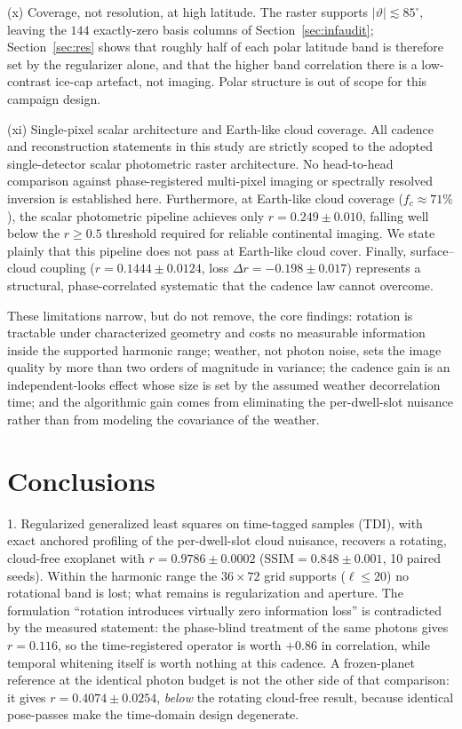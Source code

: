 \documentclass[twocolumn,10pt]{article}
\begin{document}
(x) Coverage, not resolution, at high latitude. The raster supports
$|\vartheta|\lesssim85^{\circ}$, leaving the $144$ exactly-zero basis columns of
Section~\ref{sec:infaudit}; Section~\ref{sec:res} shows that roughly half of each
polar latitude band is therefore set by the regularizer alone, and that the
higher band correlation there is a low-contrast ice-cap artefact, not imaging.
Polar structure is out of scope for this campaign design.

(xi) Single-pixel scalar architecture and Earth-like cloud coverage. All
cadence and reconstruction statements in this study are strictly scoped to the
adopted single-detector scalar photometric raster architecture. No head-to-head
comparison against phase-registered multi-pixel imaging or spectrally resolved
inversion is established here. Furthermore, at Earth-like cloud coverage
($f_c \approx 71\%$), the scalar photometric pipeline achieves only $r=0.249\pm0.010$,
falling well below the $r \ge 0.5$ threshold required for reliable continental
imaging. We state plainly that this pipeline does not pass at Earth-like cloud cover.
Finally, surface--cloud coupling ($r=0.1444\pm0.0124$, loss $\Delta r=-0.198\pm0.017$)
represents a structural, phase-correlated systematic that the cadence law cannot overcome.

These limitations narrow, but do not remove, the core findings: rotation is
tractable under characterized geometry and costs no measurable information
inside the supported harmonic range; weather, not photon noise, sets the image
quality by more than two orders of magnitude in variance; the cadence gain is an
independent-looks effect whose size is set by the assumed weather decorrelation
time; and the algorithmic gain comes from eliminating the per-dwell-slot nuisance
rather than from modeling the covariance of the weather.
\section{Conclusions}
\label{sec:conclusions}

1. Regularized generalized least squares on time-tagged samples (TDI), with
exact anchored profiling of the per-dwell-slot cloud nuisance, recovers a
rotating, cloud-free exoplanet with $r=0.9786\pm0.0002$
($\mathrm{SSIM}=0.848\pm0.001$, 10 paired seeds). Within the harmonic range the
$36\times72$ grid supports ($\ell\le20$) no rotational band is lost; what remains
is regularization and aperture. The formulation ``rotation introduces
virtually zero information loss'' is contradicted by the measured statement: the
phase-blind treatment of the same photons gives $r=0.116$, so the time-registered
operator is worth $+0.86$ in correlation, while temporal whitening itself is
worth nothing at this cadence. A frozen-planet reference at the identical photon
budget is not the other side of that comparison: it gives $r=0.4074\pm0.0254$,
\emph{below} the rotating cloud-free result, because identical pose-passes make
the time-domain design degenerate.
\end{document}
